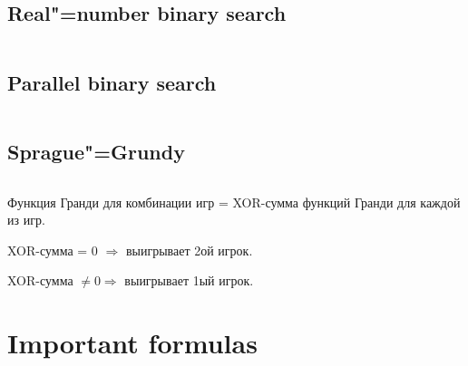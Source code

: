 ﻿\documentclass[10pt,twocolumn,oneside]{article}
\begin{document}
\subsection{Real"=number binary search}
\inputminted[breaklines]{cpp}{Other algorithms/float binsearch.cpp}
\subsection{Parallel binary search}
\inputminted[breaklines]{cpp}{Other algorithms/parallel binsearch.cpp}
\subsection{Sprague"=Grundy}
\inputminted[breaklines]{cpp}{Other algorithms/sprague-grundy.cpp}

Функция Гранди для комбинации игр = XOR-сумма функций Гранди для каждой из игр.

XOR-сумма = 0 $\Rightarrow$ выигрывает 2ой игрок.

XOR-сумма $\ne 0 \Rightarrow$ выигрывает 1ый игрок.

\section{Important formulas}

\end{document}

